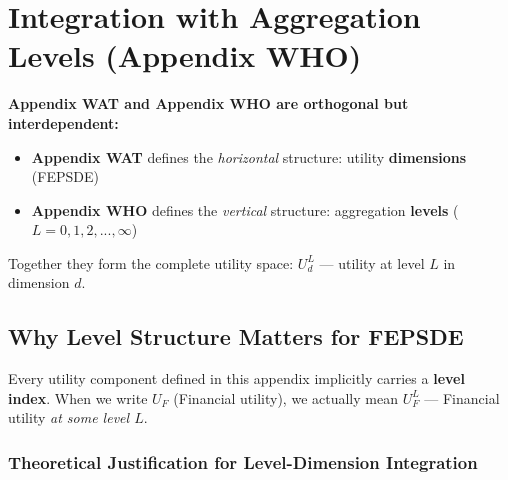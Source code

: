 \section{Integration with Aggregation Levels (Appendix WHO)}
\label{sec:app-c-aaa-integration}

\begin{tcolorbox}[colback=blue!5!white, colframe=blue!75!black, 
    title=Critical Integration: Appendix WAT $\times$ Appendix WHO]
\textbf{Appendix WAT and Appendix WHO are orthogonal but interdependent:}
\begin{itemize}[nosep]
\item \textbf{Appendix WAT} defines the \textit{horizontal} structure: utility \textbf{dimensions} (FEPSDE)
\item \textbf{Appendix WHO} defines the \textit{vertical} structure: aggregation \textbf{levels} ($L = 0, 1, 2, ..., \infty$)
\end{itemize}

Together they form the complete utility space: $U^L_d$ --- utility at level $L$ in dimension $d$.
\end{tcolorbox}

\subsection{Why Level Structure Matters for FEPSDE}

Every utility component defined in this appendix implicitly carries a \textbf{level index}. 
When we write $U_F$ (Financial utility), we actually mean $U^L_F$ --- Financial utility 
\textit{at some level $L$}.

\subsubsection{Theoretical Justification for Level-Dimension Integration}


